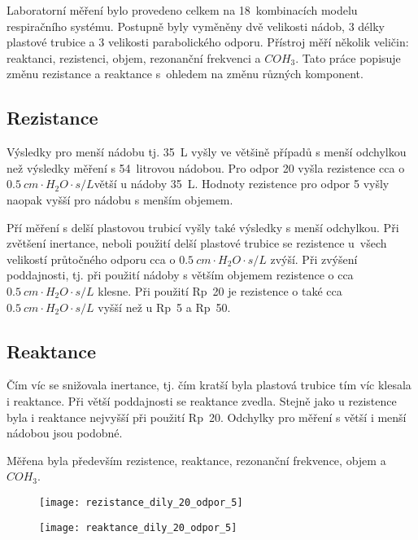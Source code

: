 \label{kap-vysledky}
Laboratorní měření bylo provedeno celkem na 18~kombinacích modelu respiračního systému. Postupně byly vyměněny dvě velikosti nádob, 3 délky plastové trubice a 3 velikosti parabolického odporu. Přístroj měří několik veličin: reaktanci, rezistenci, objem, rezonanční frekvenci a $COH_{3}$. Tato práce popisuje změnu rezistance a reaktance s~ohledem na změnu různých komponent.  

 
\subsection{Rezistance}

Výsledky pro menší nádobu tj. \SI{35}{L} vyšly ve většině případů s menší odchylkou než výsledky měření s 54~litrovou nádobou. Pro odpor 20 vyšla rezistence cca o $\SI{0,5}{cm\cdot H_{2}O \cdot s/L} $větší u nádoby \SI{35}{L}. Hodnoty rezistence pro odpor 5 vyšly naopak vyšší pro nádobu s menším objemem. 

Pří měření s delší plastovou trubicí vyšly také výsledky s menší odchylkou. 
Při zvětšení inertance, neboli použití delší plastové trubice se rezistence u~všech velikostí průtočného odporu cca o  $\SI{0,5}{ cm\cdot H_{2}O \cdot s/L} $ zvýší. 
Při zvýšení poddajnosti, tj. při použití nádoby s  větším objemem rezistence o cca  $\SI{0,5}{ cm\cdot H_{2}O \cdot s/L} $  klesne. 
Při použití Rp~20 je rezistence o také cca  $\SI{0,5}{ cm\cdot H_{2}O \cdot s/L} $  vyšší než u Rp~5 a Rp~50. 

\subsection{Reaktance}

Čím víc se snižovala inertance, tj. čím kratší byla plastová trubice tím víc klesala i reaktance. Při větší poddajnosti se reaktance zvedla. Stejně jako u rezistence byla i reaktance nejvyšší při použití Rp~20. Odchylky pro měření s větší i menší nádobou jsou podobné. 


Měřena byla především rezistence, reaktance, rezonanční frekvence, objem a $COH_{3}$. 



\begin{figure}
\centering
\begin{minipage}{.5\textwidth}
  \centering
  \texttt{[image: rezistance\_dily\_20\_odpor\_5]}
\captionsetup{justification=centering}
\end{minipage}%
\begin{minipage}{.5\textwidth}
  \centering
  \texttt{[image: reaktance\_dily\_20\_odpor\_5]}
\captionsetup{justification=centering}
\end{minipage}
\end{figure}


